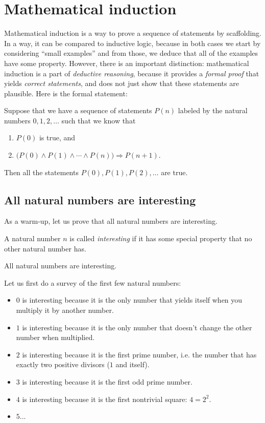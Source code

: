 \chapter{Mathematical induction}

Mathematical induction is a way to prove a sequence of statements by scaffolding. In a way, it can be compared to inductive logic, because in both cases we start by considering ``small examples'' and from those, we deduce that all of the examples have some property. However, there is an important distinction: mathematical induction is a part of \emph{deductive reasoning}, because it provides a \emph{formal proof}   that yields \emph{correct statements}, and does not just show that these statements are plausible. Here is the formal statement:

\begin{theorem}
Suppose that we have a sequence of statements $P(n)$ labeled by the natural numbers $0,1,2,\dots$ such that we know that 
\begin{enumerate}
    \item $P(0)$ is true, and
    \item $\big( P(0) \wedge P(1) \wedge \cdots \wedge P(n) \big) \Rightarrow P(n+1)$.
\end{enumerate}
  Then all the statements $P(0), P(1), P(2), \dots$ are true.
\end{theorem}


\section{All natural numbers are interesting}

As a warm-up, let us prove that all natural numbers are interesting.

\begin{definition}
A natural number $n$ is called \emph{interesting} if it has some special property that no other natural number has.
\end{definition}

\begin{theorem}
All natural numbers are interesting.
\end{theorem}

Let us first do a survey of the first few natural numbers:
\begin{itemize}
\item $0$ is interesting because it is the only number that yields itself when you multiply it by another number.
\item $1$ is interesting because it is the only number that doesn't change the other number when multiplied.
\item $2$ is interesting because it is the first prime number, i.e. the number that has exactly two positive divisors ($1$ and itself).
\item $3$ is interesting because it is the first odd prime number.
\item $4$ is interesting because it is the first nontrivial square: $4 = 2^2$.
\item $5$...
\end{itemize}


